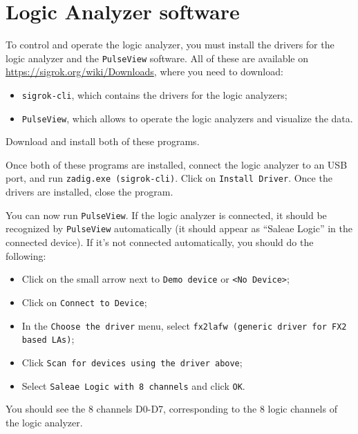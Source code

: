 
\section{Logic Analyzer software}
\label{app:software_logic_analyzer}

To control and operate the logic analyzer, you must install the drivers for the logic analyzer and the \texttt{PulseView} software. All of these are available on \url{https://sigrok.org/wiki/Downloads}, where you need to download: 
\begin{itemize}
	\item \texttt{sigrok-cli}, which contains the drivers for the logic analyzers; 
	\item \texttt{PulseView}, which allows to operate the logic analyzers and visualize the data. 
\end{itemize}
Download and install both of these programs. 

Once both of these programs are installed, connect the logic analyzer to an USB port, and run \texttt{zadig.exe (sigrok-cli)}. Click on \texttt{Install Driver}. Once the drivers are installed, close the program. 

You can now run \texttt{PulseView}. If the logic analyzer is connected, it should be recognized by \texttt{PulseView} automatically (it should appear as ``Saleae Logic'' in the connected device). If it's not connected automatically, you should do the following: 
\begin{itemize}
	\item Click on the small arrow next to \texttt{Demo device} or \texttt{<No Device>}; 
	\item Click on \texttt{Connect to Device}; 
	\item In the \texttt{Choose the driver} menu, select \texttt{fx2lafw (generic driver for FX2 based LAs)}; 
	\item Click \texttt{Scan for devices using the driver above}; 
	\item Select \texttt{Saleae Logic with 8 channels} and click \texttt{OK}. 
\end{itemize}
You should see the 8 channels D0-D7, corresponding to the 8 logic channels of the logic analyzer. 

